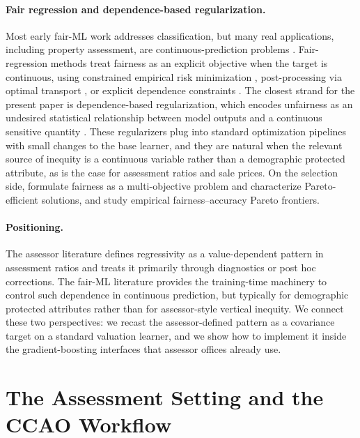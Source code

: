 \documentclass[12pt]{article}
\theoremstyle{plain}
\theoremstyle{definition}
\newcommand{\1}{\mathbf{1}}
\begin{document}
\paragraph{Fair regression and dependence-based regularization.}
Most early fair-ML work addresses classification, but many real applications, including property assessment, are continuous-prediction problems \cite{CatonHaas2024,BarocasHardtNarayanan2023}. Fair-regression methods treat fairness as an explicit objective when the target is continuous, using constrained empirical risk minimization \cite{AgarwalDudikWu2019,FitzsimonsEtAl2019,WeiEtAl2023}, post-processing via optimal transport \cite{ChzhenEtAl2020Wasserstein,ChzhenEtAl2020Recalibration}, or explicit dependence constraints \cite{KomiyamaEtAl2018,ScutariPaneroProissl2022}. The closest strand for the present paper is dependence-based regularization, which encodes unfairness as an undesired statistical relationship between model outputs and a continuous sensitive quantity \cite{MaryEtAl2019,PerezSuayEtAl2017,LiEtAl2022Fairness,lee2022maximal,BuylDefranceDeBie2024FAIRRET}. These regularizers plug into standard optimization pipelines with small changes to the base learner, and they are natural when the relevant source of inequity is a continuous variable rather than a demographic protected attribute, as is the case for assessment ratios and sale prices. On the selection side, \textcite{martinez2020minimax} formulate fairness as a multi-objective problem and characterize Pareto-efficient solutions, and \textcite{little2022fairness} study empirical fairness--accuracy Pareto frontiers.

\paragraph{Positioning.}
The assessor literature defines regressivity as a value-dependent pattern in assessment ratios and treats it primarily through diagnostics or post hoc corrections. The fair-ML literature provides the training-time machinery to control such dependence in continuous prediction, but typically for demographic protected attributes rather than for assessor-style vertical inequity. We connect these two perspectives: we recast the assessor-defined pattern as a covariance target on a standard valuation learner, and we show how to implement it inside the gradient-boosting interfaces that assessor offices already use.


\section{The Assessment Setting and the CCAO Workflow}
\label{sec:problem_setting}
\end{document}
